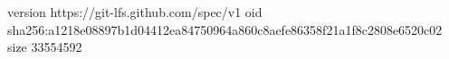 version https://git-lfs.github.com/spec/v1
oid sha256:a1218e08897b1d04412ea84750964a860c8aefe86358f21a1f8c2808e6520c02
size 33554592
